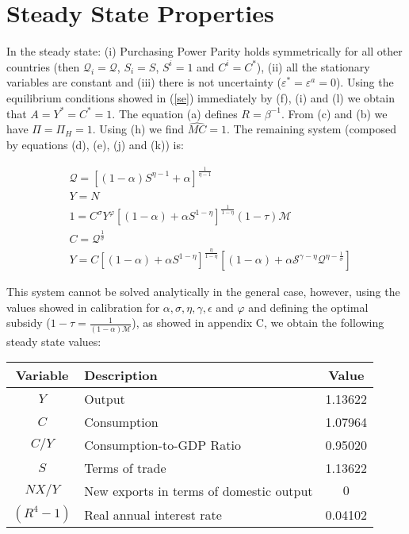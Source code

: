 \documentclass{article}
\begin{document}
\section{Steady State Properties}
In the steady state: (i) Purchasing Power Parity holds symmetrically for all other countries (then $\mathcal Q_i = \mathcal Q$, $S_i = S$, $S^i=1$ and $C^i = C^*$), (ii) all the stationary variables are constant and (iii) there is not uncertainty ($\varepsilon^* = \varepsilon^a = 0$).  Using the equilibrium conditions showed in (\ref{se}) immediately by (f), (i) and (l) we obtain that $A = Y^* = C^* = 1$. The equation (a) defines $R = \beta^{-1}$. From (c) and (b) we have $\Pi = \Pi_H = 1$. Using (h) we find $\widehat{MC} = 1$. The remaining system (composed by equations (d), (e), (j) and (k)) is:

\begin{subequations}
    \label{ser}
    \begin{align}
        &\mathcal{Q} = \left[(1-\alpha)S^{\eta-1} + \alpha \right]^{\frac{1}{\eta-1}}\\
        &Y =  N\\
        &1 = C^\sigma Y^\varphi \left[(1-\alpha) + \alpha S^{1-\eta} \right]^{\frac{1}{1-\eta}} (1 - \tau) \mathcal M\\
        &C = \mathcal Q^{\frac{1}{\sigma}}\\
        &Y = C \left[(1-\alpha) + \alpha S^{1-\eta} \right]^{\frac{\eta}{1-\eta}} \left[(1-\alpha)  +  \alpha \mathcal S^{\gamma - \eta} \mathcal Q^{\eta - \frac{1}{\sigma}} \right]
    \end{align}
\end{subequations}

This system cannot be solved analytically in the general case, however, using the values showed in calibration for $\alpha, \sigma, \eta, \gamma, \epsilon$ and $\varphi$ and defining the optimal subsidy ($ 1-\tau = \frac{1}{(1-\alpha)\mathcal M}  $), as showed in appendix C, we obtain the following steady state values:

\begin{table}[H]
    \centering
    \begin{tabular}{clc}
        \hline
        \textbf{Variable} & \textbf{Description} & \textbf{Value}\\
        \hline
        $Y$ & Output & 1.13622 \\
        $C$ & Consumption & 1.07964 \\
        $C/Y$ & Consumption-to-GDP Ratio & 0.95020 \\
        $S$ & Terms of trade & 1.13622 \\
        $NX/Y$ & New exports in terms of domestic output & $0$\\
        $(R^4 -1)$ & Real annual interest rate &  0.04102\\
        \hline
    \end{tabular}
\end{table}
\end{document}
